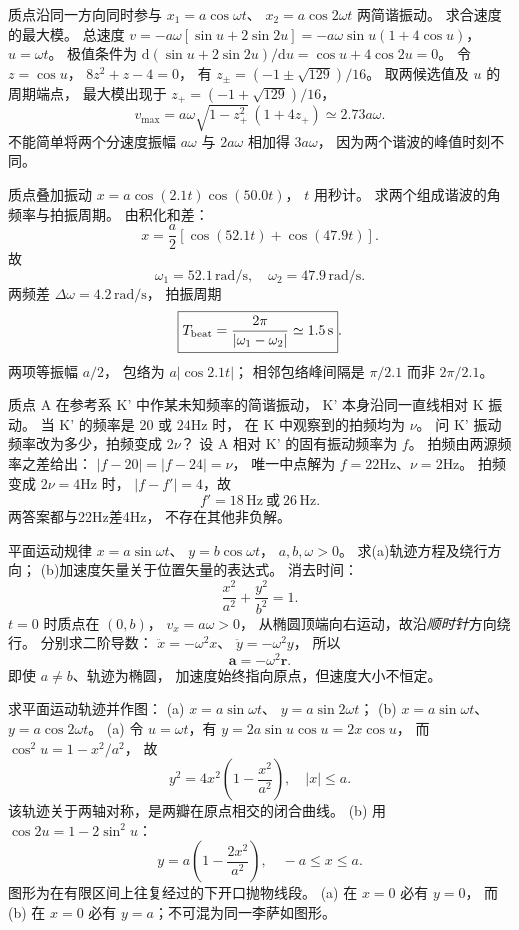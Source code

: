 质点沿同一方向同时参与
$x_1=a\cos\omega t$、
$x_2=a\cos2\omega t$ 两简谐振动。
求合速度的最大模。
\exsolution
总速度
$v=-a\omega[\sin u+2\sin2u]
=-a\omega\sin u(1+4\cos u)$，
$u=\omega t$。
极值条件为
$\mathrm d(\sin u+2\sin2u)/\mathrm du
=\cos u+4\cos2u=0$。
令 $z=\cos u$，
$8z^2+z-4=0$，
有
$z_\pm=(-1\pm\sqrt{129})/16$。
取两候选值及 $u$ 的周期端点，
最大模出现于 $z_+=(-1+\sqrt{129})/16$，
\[
\boxed{v_{\max}=a\omega
\sqrt{1-z_+^2}\,(1+4z_+)
\simeq2.73a\omega}.
\]
\excheck 不能简单将两个分速度振幅
$a\omega$ 与 $2a\omega$ 相加得 $3a\omega$，
因为两个谐波的峰值时刻不同。

质点叠加振动
$x=a\cos(2.1t)\cos(50.0t)$，
$t$ 用秒计。
求两个组成谐波的角频率与拍振周期。
\exsolution
由积化和差：
\[
x=\frac a2[\cos(52.1t)+\cos(47.9t)].
\]
故
\[
\boxed{\omega_1=52.1\,\mathrm{rad/s},
\quad\omega_2=47.9\,\mathrm{rad/s}}.
\]
两频差
$\Delta\omega=4.2\,\mathrm{rad/s}$，
拍振周期
\[
\boxed{T_{\rm beat}=\frac{2\pi}{|\omega_1-\omega_2|}
\simeq1.5\,\mathrm s}.
\]
\excheck 两项等振幅 $a/2$，
包络为 $a|\cos2.1t|$；
相邻包络峰间隔是 $\pi/2.1$ 而非 $2\pi/2.1$。

质点 A 在参考系 K' 中作某未知频率的简谐振动，
K' 本身沿同一直线相对 K 振动。
当 K' 的频率是 $20$ 或 $24$Hz 时，
在 K 中观察到的拍频均为 $\nu$。
问 K' 振动频率改为多少，拍频变成 $2\nu$？
\exsolution
设 A 相对 K' 的固有振动频率为 $f$。
拍频由两源频率之差给出：
$|f-20|=|f-24|=\nu$，
唯一中点解为
$f=22$Hz、$\nu=2$Hz。
拍频变成 $2\nu=4$Hz 时，
$|f-f'|=4$，故
\[
\boxed{f'=18\,\mathrm{Hz}\ \text{或}\ 26\,\mathrm{Hz}}.
\]
\excheck 两答案都与22Hz差4Hz，
不存在其他非负解。

平面运动规律
$x=a\sin\omega t$、
$y=b\cos\omega t$，
$a,b,\omega>0$。
求(a)轨迹方程及绕行方向；
(b)加速度矢量关于位置矢量的表达式。
\exsolution
消去时间：
\[
\boxed{\frac{x^2}{a^2}+\frac{y^2}{b^2}=1}.
\]
$t=0$ 时质点在 $(0,b)$，
$v_x=a\omega>0$，
从椭圆顶端向右运动，故沿\emph{顺时针}方向绕行。
分别求二阶导数：
$\ddot x=-\omega^2x$、
$\ddot y=-\omega^2y$，
所以
\[
\boxed{\bm a=-\omega^2\bm r}.
\]
\excheck 即使 $a\ne b$、轨迹为椭圆，
加速度始终指向原点，但速度大小不恒定。

求平面运动轨迹并作图：
(a) $x=a\sin\omega t$、
$y=a\sin2\omega t$；
(b) $x=a\sin\omega t$、
$y=a\cos2\omega t$。
\exsolution
(a) 令 $u=\omega t$，有
$y=2a\sin u\cos u=2x\cos u$，
而 $\cos^2u=1-x^2/a^2$，
故
\[
\boxed{y^2=4x^2\left(1-\frac{x^2}{a^2}\right)},
\quad |x|\le a.
\]
该轨迹关于两轴对称，是两瓣在原点相交的闭合曲线。
(b) 用
$\cos2u=1-2\sin^2u$：
\[
\boxed{y=a\left(1-\frac{2x^2}{a^2}\right)},
\quad -a\le x\le a.
\]
图形为在有限区间上往复经过的下开口抛物线段。
\excheck (a) 在 $x=0$ 必有 $y=0$，
而 (b) 在 $x=0$ 必有 $y=a$；不可混为同一李萨如图形。

